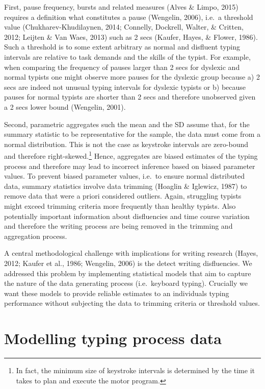 \documentclass[english,jou,floatsintext]{apa7}
\begin{document}
First, pause frequency, bursts and related measures (Alves \& Limpo, 2015) requires a definition what constitutes a pause (Wengelin, 2006), i.e.~a threshold value (Chukharev-Khudilaynen, 2014; Connelly, Dockrell, Walter, \& Critten, 2012; Leijten \& Van Waes, 2013) such as 2 secs (Kaufer, Hayes, \& Flower, 1986). Such a threshold is to some extent arbitrary as normal and disfluent typing intervals are relative to task demands and the skills of the typist. For example, when comparing the frequency of pauses larger than 2 secs for dyslexic and normal typists one might observe more pauses for the dyslexic group because a) 2 secs are indeed not unusual typing intervals for dyslexic typists or b) because pauses for normal typists are shorter than 2 secs and therefore unobserved given a 2 secs lower bound (Wengelin, 2001).

Second, parametric aggregates such the mean and the SD assume that, for the summary statistic to be representative for the sample, the data must come from a normal distribution. This is not the case as keystroke intervals are zero-bound and therefore right-skewed.\footnote{In fact, the minimum size of keystroke intervals is determined by the time it takes to plan and execute the motor program.} Hence, aggregates are biased estimates of the typing process and therefore may lead to incorrect inference based on biased parameter values. To prevent biased parameter values, i.e.~to ensure normal distributed data, summary statistics involve data trimming (Hoaglin \& Iglewicz, 1987) to remove data that were a priori considered outliers. Again, struggling typists might exceed trimming criteria more frequently than healthy typists. Also potentially important information about disfluencies and time course variation and therefore the writing process are being removed in the trimming and aggregation process.

A central methodological challenge with implications for writing research (Hayes, 2012; Kaufer et al., 1986; Wengelin, 2006) is the detect writing disfluencies. We addressed this problem by implementing statistical models that aim to capture the nature of the data generating process (i.e.~keyboard typing). Crucially we want these models to provide reliable estimates to an individuals typing performance without subjecting the data to trimming criteria or threshold values.

\hypertarget{modelling-typing-process-data}{%
\section{Modelling typing process data}\label{modelling-typing-process-data}}
\end{document}
